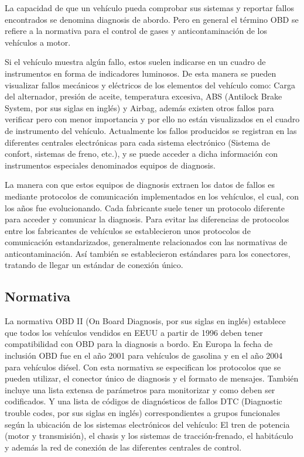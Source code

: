 La capacidad de que un vehículo pueda comprobar sus sistemas y reportar fallos encontrados se denomina diagnosis de abordo. Pero en general el término OBD se refiere a la normativa para el control de gases y anticontaminación de los vehículos a motor.

Si el vehículo muestra algún fallo, estos suelen indicarse en un cuadro de instrumentos en forma de indicadores luminosos. De esta manera se pueden visualizar fallos mecánicos y eléctricos de los elementos del vehículo como: Carga del alternador, presión de aceite, temperatura excesiva, ABS (Antilock Brake System, por sus siglas en inglés) y Airbag, además existen otros fallos para verificar pero con menor importancia y por ello no están visualizados en el cuadro de instrumento del vehículo. Actualmente los fallos producidos se registran en las diferentes centrales electrónicas para cada sistema electrónico (Sistema de confort, sistemas de freno, etc.),  y se puede acceder a dicha información con instrumentos especiales denominados equipos de diagnosis.

La manera con que estos equipos de diagnosis  extraen los datos de fallos es mediante protocolos  de comunicación implementados en los vehículos, el cual, con los años fue evolucionando. Cada fabricante suele tener un protocolo diferente para acceder y comunicar la diagnosis. Para evitar las diferencias de protocolos entre los fabricantes de vehículos se establecieron unos protocolos de comunicación estandarizados, generalmente relacionados con las normativas de anticontaminación. Así también se establecieron estándares para los conectores, tratando de llegar un estándar de conexión único. 

\subsection{Normativa}

La normativa OBD II (On Board Diagnosis, por sus siglas en inglés) establece que todos los vehículos vendidos en EEUU a partir de 1996 deben tener compatibilidad con OBD para la diagnosis a bordo. En Europa la fecha de inclusión OBD fue en el año 2001 para vehículos de gasolina y en el año 2004 para vehículos diésel. Con esta normativa se especifican los protocolos que se pueden utilizar, el conector único de diagnosis y el formato de mensajes.
También incluye una lista extensa de parámetros para monitorizar  y como deben ser codificados. Y una lista de códigos de diagnósticos de fallos DTC (Diagnostic trouble codes, por sus siglas en inglés) correspondientes a grupos funcionales según la ubicación de los sistemas electrónicos del vehículo: El tren de potencia (motor y transmisión), el chasis y los sistemas de tracción-frenado, el habitáculo y  además la red de conexión de las diferentes centrales de control.

